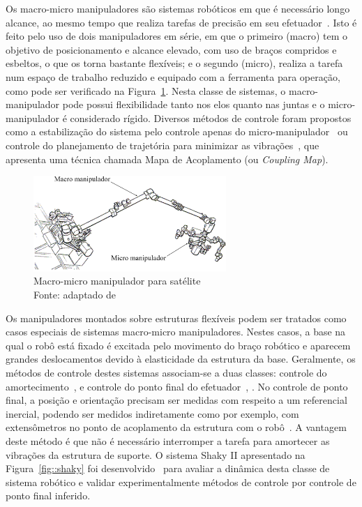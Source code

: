 Os macro-micro manipuladores são sistemas robóticos em que é necessário longo
alcance, ao mesmo tempo que realiza tarefas de precisão em seu
efetuador~\cite{sharon1993macro}.
Isto é feito pelo uso de dois manipuladores em série, em que o primeiro (macro)
tem o objetivo de posicionamento e alcance elevado, com uso de braços compridos
e esbeltos, o que os torna bastante flexíveis; e o segundo (micro), realiza a
tarefa num espaço de trabalho reduzido e equipado com a ferramenta para
operação, como pode ser verificado na Figura~\ref{fig::macro_micro}. Nesta
classe de sistemas, o macro-manipulador pode possui flexibilidade tanto nos elos
quanto nas juntas e o micro-manipulador é considerado rígido.
Diversos métodos de controle foram propostos como a estabilização do sistema
pelo controle apenas do micro-manipulador~\cite{book1989vibration} ou controle
do planejamento de trajetória para minimizar as vibrações~\cite{torres1993path},
que apresenta uma técnica chamada Mapa de Acoplamento (ou \textit{Coupling
Map}). 

\begin{figure}[h]
	\centering 
 	\includegraphics[width=0.65\textwidth]{figs/macro_micro}
 	\caption[Macro-micro manipulador]{Macro-micro manipulador para satélite \\
 	Fonte: adaptado de \cite{schubert2000impedance}}
 	\label{fig::macro_micro}
\end{figure}

Os manipuladores montados sobre estruturas flexíveis podem ser tratados como
casos especiais de sistemas macro-micro manipuladores. Nestes casos, a base na
qual o robô está fixado é excitada pelo movimento do braço robótico e aparecem
grandes deslocamentos devido à elasticidade da estrutura da base.
Geralmente, os métodos de controle destes sistemas associam-se a duas classes:
controle do amortecimento~\cite{george2002inertial}, \cite{lew2001simple} e
controle do ponto final do efetuador~\cite{sharon1993macro},
\cite{torres1993path}. No controle de ponto final, a posição e orientação
precisam ser medidas com respeito a um referencial inercial, podendo ser medidos
indiretamente como por exemplo, com extensômetros no ponto de acoplamento da
estrutura com o robô~\cite{mavroidis1997optimal}.
A vantagem deste método é que não é necessário interromper a tarefa para
amortecer as vibrações da estrutura de suporte. O sistema Shaky II apresentado
na Figura~\ref{fig::shaky} foi desenvolvido~\cite{mavroidis1997optimal}
para avaliar a dinâmica desta classe de sistema robótico e validar
experimentalmente métodos de controle por controle de ponto final inferido.

